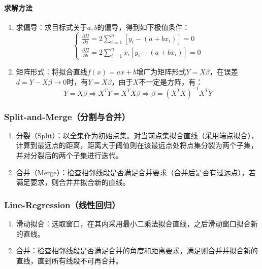 \documentclass[
12pt, %
a4paper, 
oneside, %
headinclude,footinclude, %
]{scrartcl}
\begin{document}
\paragraph{求解方法}
\begin{enumerate}
\item 求偏导：求目标式关于$ a, b $的偏导，得到如下极值条件：
$$ \begin{cases} \frac{\partial \Pi}{\partial a} = 2 \sum_{i = 1}^{n} [y_i - (a + b x_i)] = 0 \\ \frac{\partial \Pi}{\partial b} = 2 \sum_{i = 1}^{n} x_i [y_i - (a + b x_i)] = 0 \end{cases} $$
\item 矩阵形式：将拟合直线$ f(x) = ax + b $增广为矩阵形式$ Y = X \beta $，在误差$ d = Y - X \beta \to 0 $时，有$ Y = X \beta $，由于$ X $不一定是方阵，有：
$$ Y = X \beta \Rightarrow X^T Y = X^T X \beta \Rightarrow \beta = (X^T X)^{-1}X^T Y $$
\end{enumerate}
\subsubsection[Split-and-Merge]{Split-and-Merge（分割与合并）}
\begin{enumerate}
\item 分裂（Split）：以全集作为初始点集。对当前点集拟合直线（采用端点拟合），计算到最远点的距离，距离大于阈值则在该最远点处将点集分裂为两个子集，并对分裂后的两个子集进行迭代。
\item 合并（Merge）：检查相邻线段是否满足合并要求（合并后是否有过远点），若满足要求，则合并并拟合新的直线。
\end{enumerate}
\subsubsection[Line-Regression]{Line-Regression（线性回归）}
\begin{enumerate}
\item 滑动拟合：选取窗口，在其内采用最小二乘法拟合直线，之后滑动窗口拟合新的直线。
\item 合并：检查相邻线段是否满足合并的角度和距离要求，满足则合并并拟合新的直线，直到所有线段不可再合并。
\end{enumerate}
\end{document}
